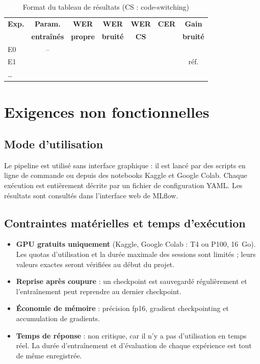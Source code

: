 \documentclass[12pt,a4paper]{report}
\begin{document}
\begin{table}[h]
  \centering
  \small
  \begin{tabular}{lcccccc}
    \toprule
    \textbf{Exp.} & \textbf{Param.} & \textbf{WER} & \textbf{WER} & \textbf{WER}
    & \textbf{CER} & \textbf{Gain} \\
    & \textbf{entraînés} & \textbf{propre} & \textbf{bruité} & \textbf{CS} & & \textbf{bruité} \\
    \midrule
    E0 & -- & & & & & \\
    E1 & & & & & & réf. \\
    \ldots & & & & & & \\
    \bottomrule
  \end{tabular}
  \caption{Format du tableau de résultats (CS : code-switching)}
  \label{tab:resultats}
\end{table}

\chapter{Exigences non fonctionnelles}

\section{Mode d'utilisation}
Le pipeline est utilisé sans interface graphique : il est lancé par des scripts en
ligne de commande ou depuis des notebooks Kaggle et Google Colab. Chaque exécution
est entièrement décrite par un fichier de configuration YAML. Les résultats sont
consultés dans l'interface web de MLflow.

\section{Contraintes matérielles et temps d'exécution}
\begin{itemize}
  \item \textbf{GPU gratuits uniquement} (Kaggle, Google Colab : T4 ou P100, 16~Go).
        Les quotas d'utilisation et la durée maximale des sessions sont limités ;
        leurs valeurs exactes seront vérifiées au début du projet.
  \item \textbf{Reprise après coupure} : un checkpoint est sauvegardé régulièrement
        et l'entraînement peut reprendre au dernier checkpoint.
  \item \textbf{Économie de mémoire} : précision fp16, gradient checkpointing et
        accumulation de gradients.
  \item \textbf{Temps de réponse} : non critique, car il n'y a pas d'utilisation en
        temps réel. La durée d'entraînement et d'évaluation de chaque expérience est
        tout de même enregistrée.
\end{itemize}
\end{document}
